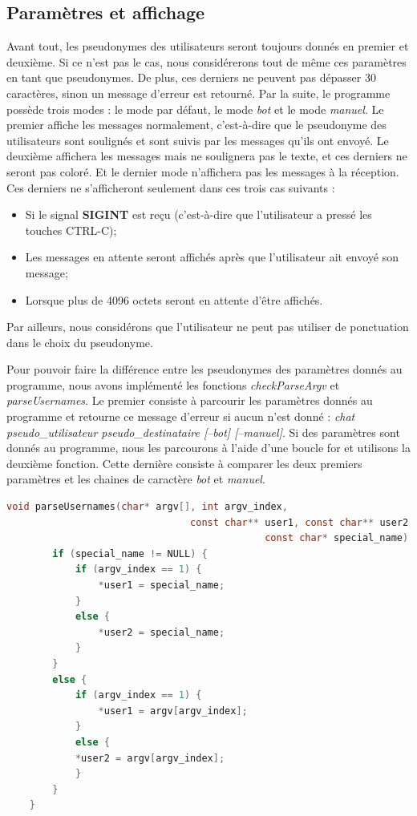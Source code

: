 \documentclass[utf8]{article}
\begin{document}
\subsection{Paramètres et affichage}
Avant tout, les pseudonymes des utilisateurs seront toujours donnés en premier et deuxième. Si ce n'est pas le cas, nous considérerons tout de même ces paramètres en tant que pseudonymes. De plus, ces derniers ne peuvent pas dépasser 30 caractères, sinon un message d'erreur est retourné.
Par la suite, le programme possède trois modes : le mode par défaut, le mode \textit{bot} et le mode \textit{manuel}. 
Le premier affiche les messages normalement, c'est-à-dire que le pseudonyme des utilisateurs sont soulignés et sont suivis par les messages qu'ils ont envoyé.
Le deuxième affichera les messages mais ne soulignera pas le texte, et ces derniers ne seront pas coloré.
Et le dernier mode n'affichera pas les messages à la réception. Ces derniers ne s'afficheront seulement dans ces trois cas suivants :
\begin{itemize}
	\item Si le signal \textbf{SIGINT} est reçu (c'est-à-dire que l'utilisateur a pressé les touches CTRL-C);
	\item Les messages en attente seront affichés après que l'utilisateur ait envoyé son message;
	\item Lorsque plus de 4096 octets seront en attente d'être affichés.
\end{itemize}
Par ailleurs, nous considérons que l'utilisateur ne peut pas utiliser de ponctuation dans le choix du pseudonyme. 

Pour pouvoir faire la différence entre les pseudonymes des paramètres donnés au programme, nous avons implémenté les fonctions \textit{checkParseArgv} et \textit{parseUsernames}.
Le premier consiste à parcourir les paramètres donnés au programme et retourne ce message d'erreur si aucun n'est donné : 
\textit{chat pseudo_utilisateur pseudo_destinataire [--bot] [--manuel]}.
Si des paramètres sont donnés au programme, nous les parcourons à l'aide d'une boucle for et utilisons la deuxième fonction. Cette dernière consiste à comparer les deux premiers paramètres et les chaines de caractère \textit{bot} et \textit{manuel}.

\begin{lstlisting}[language=C, caption=parseUsernames, basicstyle=footnotesize]
	void parseUsernames(char* argv[], int argv_index, 
                                const char** user1, const char** user2, 
                                             const char* special_name) {
		if (special_name != NULL) {
			if (argv_index == 1) {
				*user1 = special_name;
			}
			else {
				*user2 = special_name;
			}
		}
		else {
			if (argv_index == 1) {
				*user1 = argv[argv_index];
			}
			else {
			*user2 = argv[argv_index];
			}
		}		
	}
\end{lstlisting}
\end{document}
